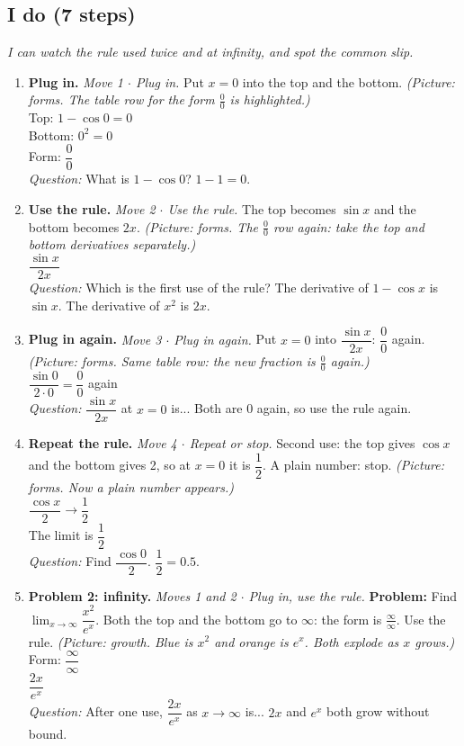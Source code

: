 \documentclass[11pt]{article}
\begin{document}
\subsection*{I do (7 steps)}
\textit{I can watch the rule used twice and at infinity, and spot the common slip.}\par
\begin{enumerate}
\item \textbf{Plug in.} \textit{Move 1 $\cdot$ Plug in.} Put $x=0$ into the top and the bottom. \textit{(Picture: forms. The table row for the form $\frac00$ is highlighted.)}\\ Top: $1-\cos0=0$\\ Bottom: $0^2=0$\\ Form: $\dfrac00$\\ \textit{Question:} What is $1-\cos0$?  $1-1=0$.
\item \textbf{Use the rule.} \textit{Move 2 $\cdot$ Use the rule.} The top becomes $\sin x$ and the bottom becomes $2x$. \textit{(Picture: forms. The $\frac00$ row again: take the top and bottom derivatives separately.)}\\ $\dfrac{\sin x}{2x}$\\ \textit{Question:} Which is the first use of the rule?  The derivative of $1-\cos x$ is $\sin x$. The derivative of $x^2$ is $2x$.
\item \textbf{Plug in again.} \textit{Move 3 $\cdot$ Plug in again.} Put $x=0$ into $\dfrac{\sin x}{2x}$: $\dfrac00$ again. \textit{(Picture: forms. Same table row: the new fraction is $\frac00$ again.)}\\ $\dfrac{\sin0}{2\cdot0}=\dfrac00$ again\\ \textit{Question:} $\dfrac{\sin x}{2x}$ at $x=0$ is...  Both are 0 again, so use the rule again.
\item \textbf{Repeat the rule.} \textit{Move 4 $\cdot$ Repeat or stop.} Second use: the top gives $\cos x$ and the bottom gives 2, so at $x=0$ it is $\dfrac12$. A plain number: stop. \textit{(Picture: forms. Now a plain number appears.)}\\ $\dfrac{\cos x}{2}\to\dfrac{1}{2}$\\ The limit is $\dfrac12$\\ \textit{Question:} Find $\dfrac{\cos0}{2}$.  $\dfrac12=0.5$.
\item \textbf{Problem 2: infinity.} \textit{Moves 1 and 2 $\cdot$ Plug in, use the rule.} \textbf{Problem:} Find $\displaystyle\lim_{x\to\infty}\dfrac{x^2}{e^x}$. Both the top and the bottom go to $\infty$: the form is $\frac{\infty}{\infty}$. Use the rule. \textit{(Picture: growth. Blue is $x^2$ and orange is $e^x$. Both explode as $x$ grows.)}\\ Form: $\dfrac{\infty}{\infty}$\\ $\dfrac{2x}{e^x}$\\ \textit{Question:} After one use, $\dfrac{2x}{e^x}$ as $x\to\infty$ is...  $2x$ and $e^x$ both grow without bound.

\end{enumerate}
\end{document}
